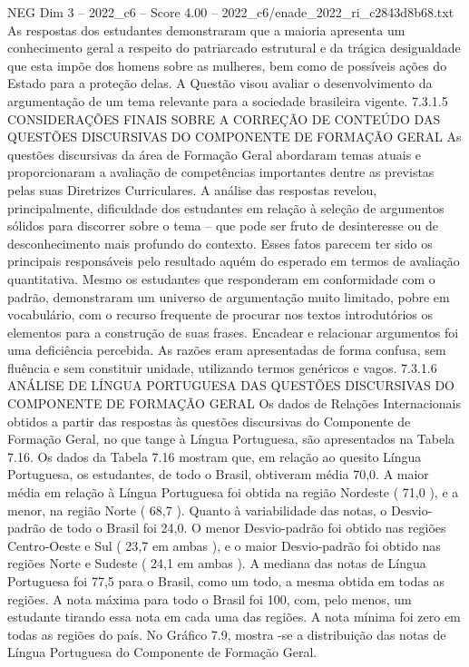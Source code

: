 \begin{textsample}{NEG Dim 3 – 2022\_c6 – Score 4.00 – 2022\_c6/enade\_2022\_ri\_c2843d8b68.txt}
As respostas dos estudantes demonstraram que a maioria apresenta um conhecimento geral a respeito do patriarcado estrutural e da trágica desigualdade que esta impõe dos homens sobre as mulheres, bem como de possíveis ações do Estado para a proteção delas.
A Questão visou avaliar o desenvolvimento da argumentação de um tema relevante para a sociedade brasileira vigente. 7.3.1.5 CONSIDERAÇÕES FINAIS SOBRE A CORREÇÃO DE CONTEÚDO DAS QUESTÕES DISCURSIVAS DO COMPONENTE DE FORMAÇÃO GERAL As questões discursivas da área de Formação Geral abordaram temas atuais e proporcionaram a avaliação de competências importantes dentre as previstas pelas suas Diretrizes Curriculares.
A análise das respostas revelou, principalmente, dificuldade dos estudantes em relação à seleção de argumentos sólidos para discorrer sobre o tema – que pode ser fruto de desinteresse ou de desconhecimento mais profundo do contexto.
Esses fatos parecem ter sido os principais responsáveis pelo resultado aquém do esperado em termos de avaliação quantitativa.
Mesmo os estudantes que responderam em conformidade com o padrão, demonstraram um universo de argumentação muito limitado, pobre em vocabulário, com o recurso frequente de procurar nos textos introdutórios os elementos para a construção de suas frases.
Encadear e relacionar argumentos foi uma deficiência percebida.
As razões eram apresentadas de forma confusa, sem fluência e sem constituir unidade, utilizando termos genéricos e vagos. 7.3.1.6 ANÁLISE DE LÍNGUA PORTUGUESA DAS QUESTÕES DISCURSIVAS DO COMPONENTE DE FORMAÇÃO GERAL Os dados de Relações Internacionais obtidos a partir das respostas às questões discursivas do Componente de Formação Geral, no que tange à Língua Portuguesa, são apresentados na Tabela 7.16.
Os dados da Tabela 7.16 mostram que, em relação ao quesito Língua Portuguesa, os estudantes, de todo o Brasil, obtiveram média 70,0.
A maior média em relação à Língua Portuguesa foi obtida na região Nordeste ( 71,0 ), e a menor, na região Norte ( 68,7 ).
Quanto à variabilidade das notas, o Desvio-padrão de todo o Brasil foi 24,0.
O menor Desvio-padrão foi obtido nas regiões Centro-Oeste e Sul ( 23,7 em ambas ), e o maior Desvio-padrão foi obtido nas regiões Norte e Sudeste ( 24,1 em ambas ).
A mediana das notas de Língua Portuguesa foi 77,5 para o Brasil, como um todo, a mesma obtida em todas as regiões.
A nota máxima para todo o Brasil foi 100, com, pelo menos, um estudante tirando essa nota em cada uma das regiões.
A nota mínima foi zero em todas as regiões do país.
No Gráfico 7.9, mostra -se a distribuição das notas de Língua Portuguesa do Componente de Formação Geral.

\end{textsample}

